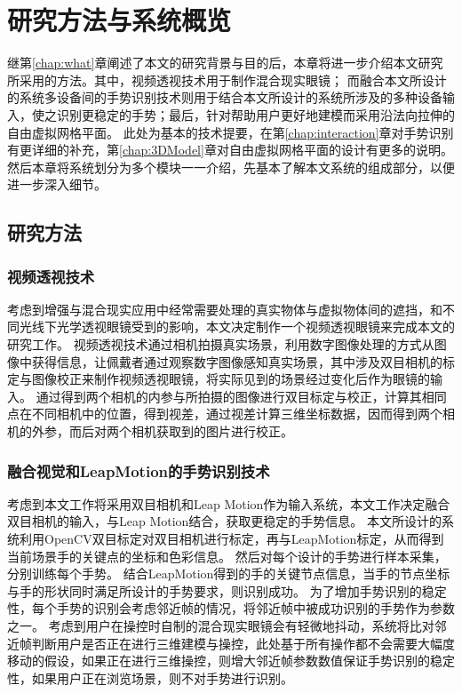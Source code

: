 
\chapter{研究方法与系统概览}
\label{chap:system}
继第\ref{chap:what}章阐述了本文的研究背景与目的后，本章将进一步介绍本文研究所采用的方法。其中，视频透视技术用于制作混合现实眼镜；
而融合本文所设计的系统多设备间的手势识别技术则用于结合本文所设计的系统所涉及的多种设备输入，使之识别更稳定的手势；最后，针对帮助用户更好地建模而采用沿法向拉伸的自由虚拟网格平面。
此处为基本的技术提要，在第\ref{chap:interaction}章对手势识别有更详细的补充，第\ref{chap:3DModel}章对自由虚拟网格平面的设计有更多的说明。
然后本章将系统划分为多个模块一一介绍，先基本了解本文系统的组成部分，以便进一步深入细节。
\section{研究方法}

\subsection{视频透视技术}
考虑到增强与混合现实应用中经常需要处理的真实物体与虚拟物体间的遮挡，和不同光线下光学透视眼镜受到的影响，本文决定制作一个视频透视眼镜来完成本文的研究工作。
视频透视技术通过相机拍摄真实场景，利用数字图像处理的方式从图像中获得信息，让佩戴者通过观察数字图像感知真实场景，其中涉及双目相机的标定与图像校正来制作视频透视眼镜，将实际见到的场景经过变化后作为眼镜的输入。
通过得到两个相机的内参与所拍摄的图像进行双目标定与校正，计算其相同点在不同相机中的位置，得到视差，通过视差计算三维坐标数据，因而得到两个相机的外参，而后对两个相机获取到的图片进行校正。

\subsection{融合视觉和LeapMotion的手势识别技术}
考虑到本文工作将采用双目相机和Leap Motion作为输入系统，本文工作决定融合双目相机的输入，与Leap Motion结合，获取更稳定的手势信息。
本文所设计的系统利用OpenCV双目标定对双目相机进行标定，再与LeapMotion标定，从而得到当前场景手的关键点的坐标和色彩信息。
然后对每个设计的手势进行样本采集，分别训练每个手势。
结合LeapMotion得到的手的关键节点信息，当手的节点坐标与手的形状同时满足所设计的手势要求，则识别成功。
为了增加手势识别的稳定性，每个手势的识别会考虑邻近帧的情况，将邻近帧中被成功识别的手势作为参数之一。
考虑到用户在操控时自制的混合现实眼镜会有轻微地抖动，系统将比对邻近帧判断用户是否正在进行三维建模与操控，此处基于所有操作都不会需要大幅度移动的假设，如果正在进行三维操控，则增大邻近帧参数数值保证手势识别的稳定性，如果用户正在浏览场景，则不对手势进行识别。

